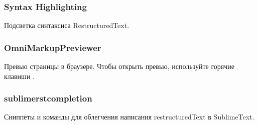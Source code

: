 \documentclass[a4paper,12pt,russian]{sphinxmanual}
\begin{document}
\subsubsection{Syntax Highlighting}
\label{\detokenize{editor:syntax-highlighting}}
Подсветка синтаксиса RestructuredText.



\subsubsection{OmniMarkupPreviewer}
\label{\detokenize{editor:omnimarkuppreviewer}}
Превью страницы в браузере. Чтобы открыть превью, используйте горячие клавиши .



\subsubsection{sublime\sphinxhyphen{}rst\sphinxhyphen{}completion}
\label{\detokenize{editor:sublime-rst-completion}}
Сниппеты и команды для облегчения написания restructuredText в SublimeText.
\end{document}

